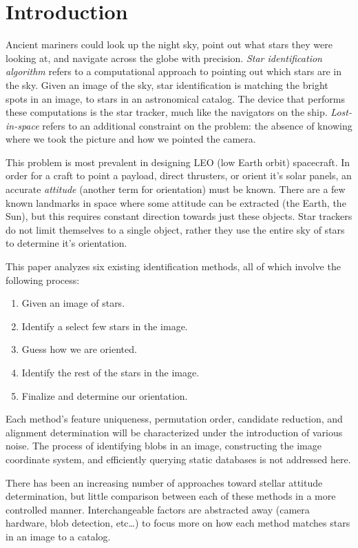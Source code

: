 \section{Introduction}\label{sec:introduction}
Ancient mariners could look up the night sky, point out what stars they were looking at, and navigate across the globe
with precision. \textit{Star identification algorithm} refers to a computational approach to pointing out which stars
are in the sky. Given an image of the sky, star identification is matching the bright spots in an image, to stars in an
astronomical catalog. The device that performs these computations is the star tracker, much like the navigators on the
ship. \textit{Lost-in-space} refers to an additional constraint on the problem: the absence of knowing where we took
the picture and how we pointed the camera.

This problem is most prevalent in designing LEO (low Earth orbit) spacecraft. In order for a craft to point a payload,
direct thrusters, or orient it's solar panels, an accurate \textit{attitude} (another term for orientation) must be
known. There are a few known landmarks in space where some attitude can be extracted (the Earth, the Sun), but this
requires constant direction towards just these objects. Star trackers do not limit themselves to a single object,
rather they use the entire sky of stars to determine it's orientation.

This paper analyzes six existing identification methods, all of which involve the following process:
\begin{enumerate}
    \item Given an image of stars.
    \item Identify a select few stars in the image.
    \item Guess how we are oriented.
    \item Identify the rest of the stars in the image.
    \item Finalize and determine our orientation.
\end{enumerate}

Each method's feature uniqueness, permutation order, candidate reduction, and alignment determination will be
characterized under the introduction of various noise. The process of identifying blobs in an image, constructing
the image coordinate system, and efficiently querying static databases is not addressed here.

There has been an increasing number of approaches toward stellar attitude determination, but little comparison between
each of these methods in a more controlled manner. Interchangeable factors are abstracted away (camera hardware, blob
detection, etc\ldots) to focus more on how each method matches stars in an image to a catalog.

